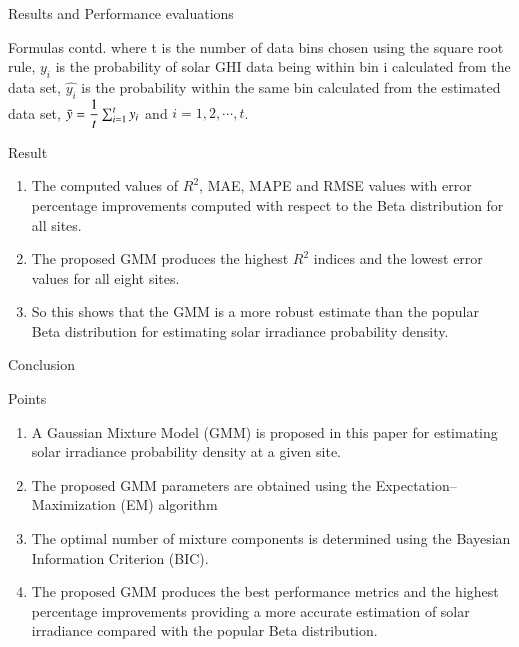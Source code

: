 \documentclass{beamer}
\begin{document}
\begin{frame}{Results and Performance evaluations }
\begin{block}{Formulas contd.}
where t is the number of data bins chosen using the square root rule, $ y_i$ is the probability of solar GHI data being within bin i calculated from the data set, $\hat{y_i}$ is the probability within the
same bin calculated from the estimated data set, $ \Bar{y} =  \dfrac{1}{t}\sum_{i=1}^{t} y_i$ and $ i=1,2,\cdots ,t$.
\end{block}
    \begin{block}{Result}
    \begin{enumerate}
        \item The computed values of  $R^2$, MAE, MAPE and RMSE values with error percentage improvements computed with respect to the Beta distribution for all sites.
        \item The proposed GMM produces the highest $ R^2$ indices and the lowest error values for all eight sites.
        \item So this shows that the GMM is a more robust estimate than the popular Beta distribution for
        estimating solar irradiance probability density.
    \end{enumerate}
    
    \end{block}
\end{frame}
\begin{frame}{Conclusion}
    \begin{block}{Points}
    \begin{enumerate}
        \item A Gaussian Mixture Model (GMM) is proposed in this paper for estimating solar irradiance probability density at a given site. 
\item The proposed GMM parameters are obtained using the Expectation–Maximization (EM) algorithm 
\item The optimal number of mixture components is determined using the Bayesian Information Criterion (BIC).
\item The proposed GMM produces the best performance metrics and the highest percentage improvements providing a more accurate estimation of solar irradiance compared with the popular Beta distribution.
    \end{enumerate}
    \end{block}
\end{frame}
\end{document}
